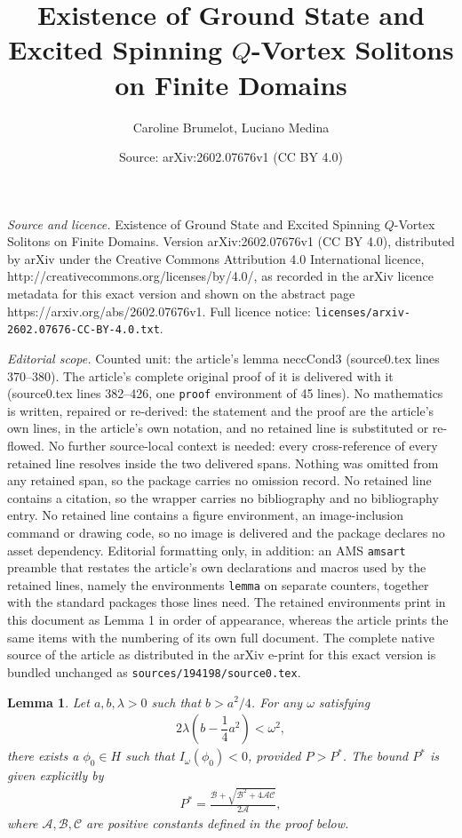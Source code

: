 \documentclass[10pt,a4paper]{amsart}
\title{Existence of Ground State and Excited Spinning $Q$-Vortex Solitons on Finite Domains}
\author{Caroline Brumelot, Luciano Medina}
\date{Source: arXiv:2602.07676v1 (CC BY 4.0)}
\newtheorem{lemma}{Lemma}
\begin{document}
\maketitle

\noindent\emph{Source and licence.} Existence of Ground State and Excited Spinning $Q$-Vortex Solitons on Finite Domains. Version arXiv:2602.07676v1 (CC BY 4.0), distributed by arXiv under the Creative Commons Attribution 4.0 International licence, http://creativecommons.org/licenses/by/4.0/, as recorded in the arXiv licence metadata for this exact version and shown on the abstract page https://arxiv.org/abs/2602.07676v1. Full licence notice: \texttt{licenses/arxiv-2602.07676-CC-BY-4.0.txt}.\par\smallskip

\noindent\textit{Editorial scope.} Counted unit: the article's lemma neccCond3 (source0.tex lines 370--380). The article's complete original proof of it is delivered with it (source0.tex lines 382--426, one \texttt{proof} environment of 45 lines). No mathematics is written, repaired or re-derived: the statement and the proof are the article's own lines, in the article's own notation, and no retained line is substituted or re-flowed.  No further source-local context is needed: every cross-reference of every retained line resolves inside the two delivered spans.  Nothing was omitted from any retained span, so the package carries no omission record.  No retained line contains a citation, so the wrapper carries no bibliography and no bibliography entry.  No retained line contains a figure environment, an image-inclusion command or drawing code, so no image is delivered and the package declares no asset dependency.  Editorial formatting only, in addition: an AMS \texttt{amsart} preamble that restates the article's own declarations and macros used by the retained lines, namely the environments \texttt{lemma} on separate counters, together with the standard packages those lines need.  The retained environments print in this document as Lemma 1 in order of appearance, whereas the article prints the same items with the numbering of its own full document.  The complete native source of the article as distributed in the arXiv e-print for this exact version is bundled unchanged as \texttt{sources/194198/source0.tex}.
	\begin{lemma}
		Let $a,b,\lambda > 0$ such that $b > a^2/4$. For any $\omega$ satisfying
		\begin{align}
			2\lambda\left(b-\dfrac{1}{4}a^2\right)<\omega^2, \label{neccCond3}
		\end{align}
		there exists a $\phi_0\in H$ such that $I_{\omega}(\phi_0)<0$, provided $P > P^*$. The bound $P^*$ is given explicitly by
		\begin{align}
			P^* = \frac{\mathcal{B} + \sqrt{\mathcal{B}^2 + 4 \mathcal{A} \mathcal{C}}}{2\mathcal{A}},
		\end{align}
		where $\mathcal{A}, \mathcal{B}, \mathcal{C}$ are positive constants defined in the proof below.
	\end{lemma}
\end{document}
